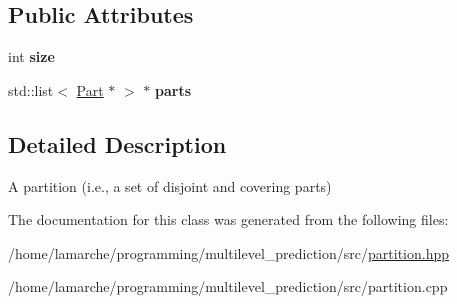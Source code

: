 \subsection*{Public Attributes}
\begin{DoxyCompactItemize}
\item 
\hypertarget{class_partition_a718bdba639f222d90d23480b58caa1f9}{int {\bfseries size}}\label{class_partition_a718bdba639f222d90d23480b58caa1f9}

\item 
\hypertarget{class_partition_a887cae6498c54754779d7956b48e8d3e}{std\-::list$<$ \hyperlink{class_part}{Part} $\ast$ $>$ $\ast$ {\bfseries parts}}\label{class_partition_a887cae6498c54754779d7956b48e8d3e}

\end{DoxyCompactItemize}


\subsection{Detailed Description}
A partition (i.\-e., a set of disjoint and covering parts) 

The documentation for this class was generated from the following files\-:\begin{DoxyCompactItemize}
\item 
/home/lamarche/programming/multilevel\-\_\-prediction/src/\hyperlink{partition_8hpp}{partition.\-hpp}\item 
/home/lamarche/programming/multilevel\-\_\-prediction/src/partition.\-cpp\end{DoxyCompactItemize}
